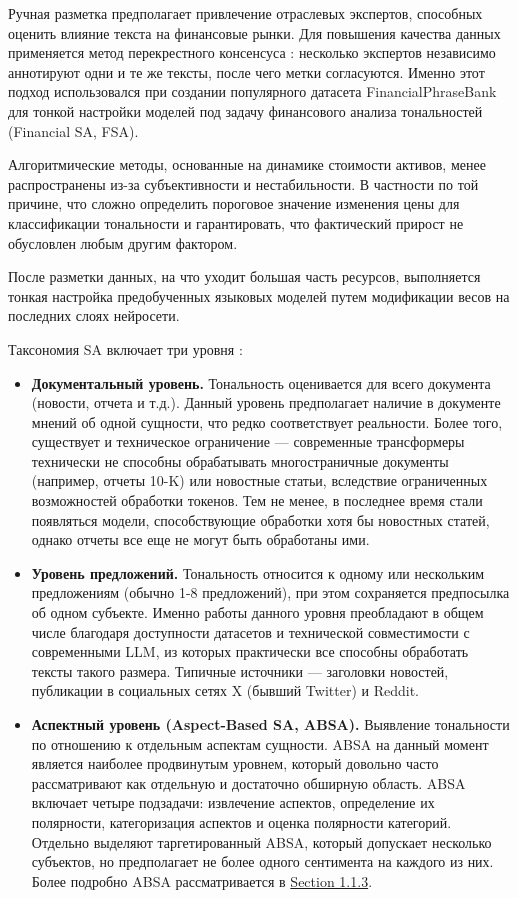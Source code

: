 Ручная разметка предполагает привлечение отраслевых экспертов, способных оценить влияние текста
на финансовые рынки. Для повышения качества данных применяется метод перекрестного консенсуса \parencite{consensus1997bogdan}:
несколько экспертов независимо аннотируют одни и те же тексты, после чего метки согласуются.
Именно этот подход использовался при создании популярного датасета FinancialPhraseBank \parencite{Malo2014FPB} для тонкой
настройки моделей под задачу финансового анализа тональностей (Financial SA, FSA).

Алгоритмические методы, основанные на динамике стоимости активов, менее распространены из-за
субъективности и нестабильности. В частности по той причине, что сложно определить пороговое
значение изменения цены для классификации тональности и гарантировать, что фактический прирост
не обусловлен любым другим фактором.

После разметки данных, на что уходит большая часть ресурсов, выполняется тонкая настройка
предобученных языковых моделей путем модификации весов на последних слоях нейросети.

Таксономия SA включает три уровня \parencite{SA2020taxonomy}:

\begin{itemize}
    \item \textbf{Документальный уровень.} Тональность оценивается для всего документа (новости, отчета и т.д.).
    Данный уровень предполагает наличие в документе мнений об одной сущности, что редко соответствует реальности.
    Более того, существует и техническое ограничение --- современные трансформеры технически не способны
    обрабатывать многостраничные документы (например, отчеты 10-K) или новостные статьи, вследствие ограниченных
    возможностей обработки токенов. Тем не менее, в последнее время стали появляться модели, способствующие обработки
    хотя бы новостных статей, однако отчеты все еще не могут быть обработаны ими.
    \item \textbf{Уровень предложений.} Тональность относится к одному или нескольким предложениям (обычно 1-8 предложений),
    при этом сохраняется предпосылка об одном субъекте. Именно работы данного уровня преобладают в общем числе благодаря
    доступности датасетов и технической совместимости с современными LLM, из которых практически все способны обработать
    тексты такого размера. Типичные источники --- заголовки новостей, публикации в социальных сетях X (бывший Twitter) и Reddit.
    \item \textbf{Аспектный уровень (Aspect-Based SA, ABSA).} Выявление тональности по отношению к отдельным аспектам сущности.
    ABSA на данный момент является наиболее  продвинутым уровнем, который довольно часто рассматривают как отдельную и достаточно
    обширную область. ABSA включает четыре подзадачи: извлечение аспектов, определение их полярности, категоризация аспектов
    и оценка полярности категорий. Отдельно выделяют таргетированный ABSA, который допускает несколько субъектов, но предполагает
    не более одного сентимента на каждого из них. Более подробно ABSA рассматривается в \hyperref[sec:absa]{Section 1.1.3}.
\end{itemize}

